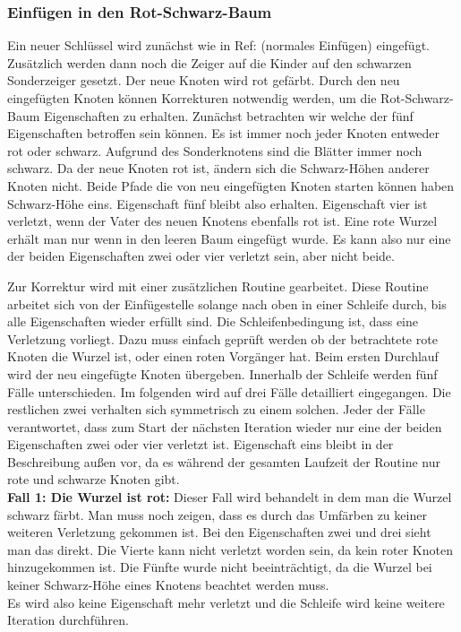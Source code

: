 \documentclass[a4paper,12pt]{article}
\begin{document}
\subsubsection{Einfügen in den Rot-Schwarz-Baum}
Ein neuer Schlüssel wird zunächst wie in Ref: (normales Einfügen) eingefügt. Zusätzlich werden dann noch die Zeiger auf die Kinder auf den schwarzen Sonderzeiger gesetzt. Der neue Knoten wird rot gefärbt. Durch den neu eingefügten Knoten können Korrekturen notwendig werden, um die Rot-Schwarz-Baum Eigenschaften zu erhalten. Zunächst betrachten wir welche der fünf Eigenschaften betroffen sein können. Es ist immer noch jeder Knoten entweder rot oder schwarz. Aufgrund des Sonderknotens sind die Blätter immer noch schwarz. Da der neue Knoten rot ist, ändern sich die Schwarz-Höhen anderer Knoten nicht. Beide Pfade die von neu eingefügten Knoten starten können haben Schwarz-Höhe eins. Eigenschaft fünf bleibt also erhalten. Eigenschaft vier ist verletzt, wenn der Vater des neuen Knotens ebenfalls rot ist. Eine rote Wurzel erhält man nur wenn in den leeren Baum eingefügt wurde. Es kann also nur eine der beiden Eigenschaften zwei oder vier verletzt sein, aber nicht beide.

 \noindent Zur Korrektur wird mit einer zusätzlichen Routine gearbeitet. Diese Routine arbeitet sich von der Einfügestelle solange nach oben in einer Schleife durch, bis alle Eigenschaften wieder erfüllt sind. Die Schleifenbedingung ist, dass eine Verletzung vorliegt. Dazu muss einfach geprüft werden ob der betrachtete rote Knoten die Wurzel ist, oder einen roten Vorgänger hat. Beim ersten Durchlauf wird der neu eingefügte Knoten übergeben. Innerhalb der Schleife werden fünf Fälle unterschieden. Im folgenden wird auf drei Fälle detailliert eingegangen. Die restlichen zwei verhalten sich symmetrisch zu einem solchen. Jeder der Fälle verantwortet, dass zum Start der nächsten Iteration wieder nur eine der beiden Eigenschaften zwei oder vier verletzt ist. Eigenschaft eins bleibt in der Beschreibung außen vor, da es während der gesamten Laufzeit der Routine nur rote und schwarze Knoten gibt. \\
\textbf{Fall 1: Die Wurzel ist rot: }
Dieser Fall wird behandelt in dem man die Wurzel schwarz färbt. Man muss noch zeigen, dass es durch das Umfärben zu keiner weiteren Verletzung gekommen ist. Bei den Eigenschaften zwei und drei sieht man das direkt. Die Vierte kann nicht verletzt worden sein, da kein roter Knoten hinzugekommen ist. Die Fünfte wurde nicht beeinträchtigt, da die Wurzel bei keiner Schwarz-Höhe eines Knotens beachtet werden muss.   \\
Es wird also keine Eigenschaft mehr verletzt und die Schleife wird keine weitere Iteration durchführen.
\end{document}
